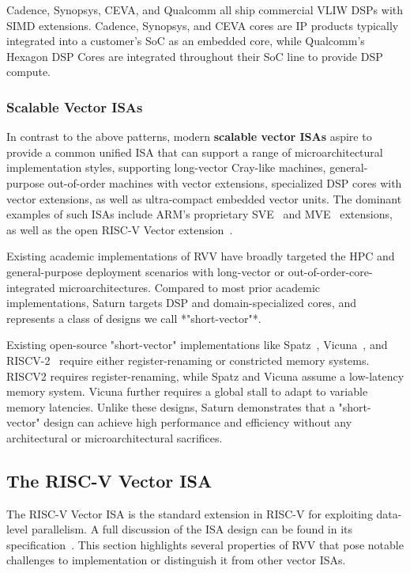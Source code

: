 Cadence, Synopsys, CEVA, and Qualcomm all ship commercial VLIW DSPs with SIMD extensions.
Cadence, Synopsys, and CEVA cores are IP products typically integrated into a customer's SoC as an embedded core, while Qualcomm's Hexagon DSP Cores are integrated throughout their SoC line to provide DSP compute.

\subsubsection{Scalable Vector ISAs}

In contrast to the above patterns, modern \textbf{scalable vector ISAs} aspire to provide a common unified ISA that can support a range of microarchitectural implementation styles, supporting long-vector Cray-like machines, general-purpose out-of-order machines with vector extensions, specialized DSP cores with vector extensions, as well as ultra-compact embedded vector units.
The dominant examples of such ISAs include ARM's proprietary SVE~\cite{arm_sve} and MVE~\cite{arm_mve} extensions, as well as the open RISC-V Vector extension~\cite{vector_extension}.

Existing academic implementations of RVV have broadly targeted the HPC and general-purpose deployment scenarios with long-vector or out-of-order-core-integrated microarchitectures.
Compared to most prior academic implementations, Saturn targets DSP and domain-specialized cores, and represents a class of designs we call *"short-vector"*.

Existing open-source "short-vector" implementations like Spatz~\cite{spatz}, Vicuna~\cite{vicuna}, and RISCV-2~\cite{patsidis_risc-v2_2020} require either register-renaming or constricted memory systems.
RISCV2 requires register-renaming, while Spatz and Vicuna assume a low-latency memory system.
Vicuna further requires a global stall to adapt to variable memory latencies.
Unlike these designs, Saturn demonstrates that a "short-vector" design can achieve high performance and efficiency without any architectural or microarchitectural sacrifices.

\subsection{The RISC-V Vector ISA}

The RISC-V Vector ISA is the standard extension in RISC-V for exploiting data-level parallelism.
A full discussion of the ISA design can be found in its specification~\cite{vector_extension}.
This section highlights several properties of RVV that pose notable challenges to implementation or distinguish it from other vector ISAs.


